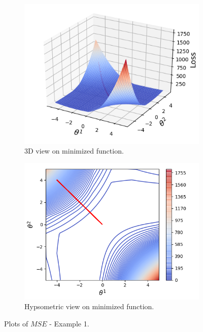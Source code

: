 \documentclass[11pt,a4paper]{IEEEtran}
\begin{document}
\begin{figure}[!hbt]
\centering
	\begin{subfigure}[b]{0.47\textwidth}
		\includegraphics[width=\textwidth]{examples/1/3d.png}
		\caption{3D view on minimized function.}
		\label{fig:ex1:3d-view}
	\end{subfigure}
	\begin{subfigure}[b]{0.47\textwidth}
		\includegraphics[width=\textwidth]{examples/1/2d.png}
		\caption{Hypsometric view on minimized function.}
		\label{fig:ex1:hypsometric}
	\end{subfigure}
	\caption{Plots of $MSE$ - Example 1.}
	\label{fig:ex1}
\end{figure}
\end{document}
